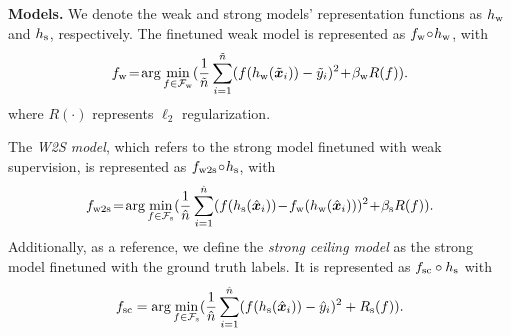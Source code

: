 \textbf{Models.} We denote the weak and strong models' representation functions as $h_{\text{w}}$ and $h_{\text{s}}$, respectively. The finetuned weak model is represented as $f_{\text{w}} \!\circ\! h_{\text{w}} $, with
$$
   f_{\text{w}} \!=\! \arg\min_{f\in{\mathcal{F}}_{\text{w}}} (\frac{1}{\tilde{n}} \sum_{i=1}^{\tilde{n}} ( f(h_{\text{w}}(\tilde{{\bm{x}}}_i))-\tilde{y}_i )^2 \!+\! \beta_{\text{w}} R(f) ).
$$
where $R(\cdot)$ represents $\ell_2$ regularization. 

The \emph{W2S model}, which refers to the strong model finetuned with weak supervision, is represented as $f_{\text{w2s}}\! \circ\! h_{\text{s}} $, with
$$
   f_{\text{w2s}} \!= \!\arg\min_{f\in{\mathcal{F}}_{\text{s}}} (\frac{1}{\hat{n}} \sum_{i=1}^{\hat{n}} ( f(h_{\text{s}}(\hat{{\bm{x}}}_i))\!-\! f_{\text{w}}(h_{\text{w}}(\hat{{\bm{x}}}_i)  ) )^2 \!+\! \beta_{\text{s}} R(f) ).
$$
Additionally, as a reference, we define the \emph{strong ceiling model} as the strong model finetuned with the ground truth labels. It is represented as $f_{\text{sc}}\circ h_{\text{s}}$ with
$$
   f_{\text{sc}} = \arg\min_{f\in{\mathcal{F}}_{\text{s}}} (\frac{1}{\hat{n}} \sum_{i=1}^{\hat{n}} ( f(h_{\text{s}}(\hat{{\bm{x}}}_i))- \hat{y}_i  )^2  + R_{\text{s}}(f) ).
$$




